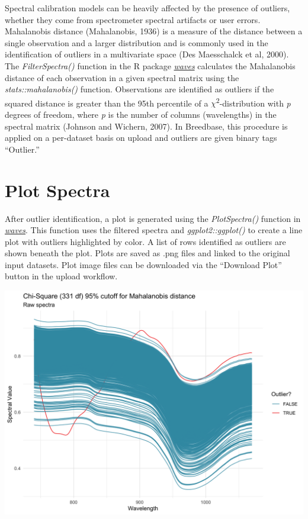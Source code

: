 \documentclass[
  12pt,
]{book}
\begin{document}
Spectral calibration models can be heavily affected by the presence of outliers, whether they come from spectrometer spectral artifacts or user errors. Mahalanobis distance (Mahalanobis, 1936) is a measure of the distance between a single observation and a larger distribution and is commonly used in the identification of outliers in a multivariate space (Des Maesschalck et al, 2000). The \emph{FilterSpectra()} function in the R package \href{https://CRAN.R-project.org/package=waves}{\emph{waves}} calculates the Mahalanobis distance of each observation in a given spectral matrix using the \emph{stats::mahalanobis()} function. Observations are identified as outliers if the squared distance is greater than the 95th percentile of a \(\chi\)\textsuperscript{2}-distribution with \emph{p} degrees of freedom, where \emph{p} is the number of columns (wavelengths) in the spectral matrix (Johnson and Wichern, 2007). In Breedbase, this procedure is applied on a per-dataset basis on upload and outliers are given binary tags ``Outlier.''

\hypertarget{plot-spectra}{%
\section{Plot Spectra}\label{plot-spectra}}

After outlier identification, a plot is generated using the \emph{PlotSpectra()} function in \href{https://CRAN.R-project.org/package=waves}{\emph{waves}}. This function uses the filtered spectra and \emph{ggplot2::ggplot()} to create a line plot with outliers highlighted by color. A list of rows identified as outliers are shown beneath the plot. Plots are saved as .png files and linked to the original input datasets. Plot image files can be downloaded via the ``Download Plot'' button in the upload workflow.

\begin{center}\includegraphics[width=0.95\linewidth]{assets/images/upload_NIRS_plot_example} \end{center}
\end{document}
